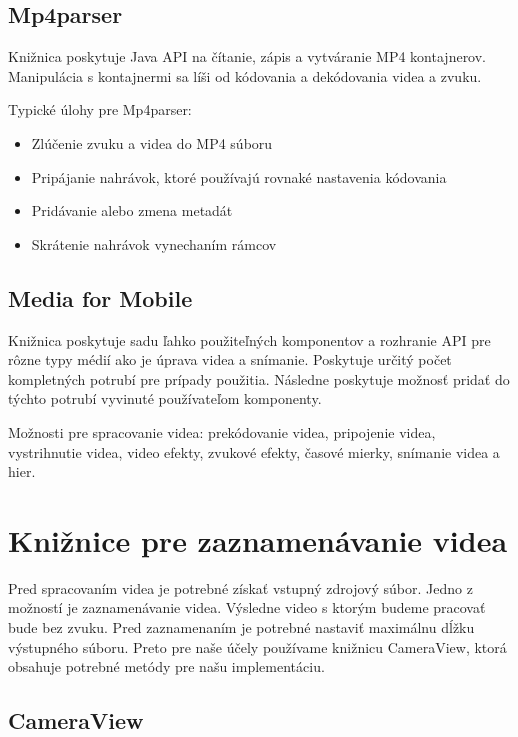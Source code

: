 \documentclass[12pt, oneside]{book}
\begin{document}
\subsection{Mp4parser}

\hspace{15pt} Knižnica poskytuje Java API na čítanie, zápis a vytváranie MP4 kontajnerov. Manipulácia s kontajnermi sa líši od kódovania a dekódovania videa a zvuku.

Typické úlohy pre Mp4parser:
\begin{itemize}
\item Zlúčenie zvuku a videa do MP4 súboru
\item Pripájanie nahrávok, ktoré používajú rovnaké nastavenia kódovania
\item Pridávanie alebo zmena metadát
\item Skrátenie nahrávok vynechaním rámcov

\end{itemize}

\subsection{Media for Mobile}

\hspace{15pt} Knižnica poskytuje sadu ľahko použiteľných komponentov a rozhranie API pre rôzne typy médií ako je úprava videa a snímanie. Poskytuje určitý počet kompletných potrubí pre prípady použitia. Následne poskytuje možnosť pridať do týchto potrubí vyvinuté používateľom komponenty.

Možnosti pre spracovanie videa: prekódovanie videa, pripojenie videa, vystrihnutie videa, video efekty, zvukové efekty, časové mierky, snímanie videa a hier.

\section{Knižnice pre zaznamenávanie videa}

\hspace{15pt} Pred spracovaním videa je potrebné získať vstupný zdrojový súbor. Jedno z možností je zaznamenávanie videa. Výsledne video s ktorým budeme pracovať bude bez zvuku. Pred zaznamenaním je potrebné nastaviť maximálnu dĺžku výstupného súboru. Preto pre naše účely používame knižnicu CameraView, ktorá obsahuje potrebné metódy pre našu implementáciu.

\subsection{CameraView}
\end{document}
